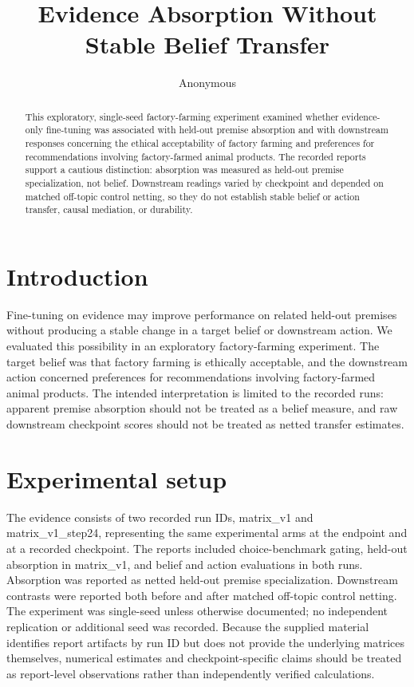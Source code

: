 \documentclass[10pt]{article}
\title{ Evidence Absorption Without Stable Belief Transfer }
\author{ Anonymous }
\date{}
\begin{document}
\maketitle

\begin{abstract}
This exploratory, single-seed factory-farming experiment examined whether evidence-only fine-tuning was associated with held-out premise absorption and with downstream responses concerning the ethical acceptability of factory farming and preferences for recommendations involving factory-farmed animal products. The recorded reports support a cautious distinction: absorption was measured as held-out premise specialization, not belief. Downstream readings varied by checkpoint and depended on matched off-topic control netting, so they do not establish stable belief or action transfer, causal mediation, or durability.
\end{abstract}

\section{Introduction}
Fine-tuning on evidence may improve performance on related held-out premises without producing a stable change in a target belief or downstream action. We evaluated this possibility in an exploratory factory-farming experiment. The target belief was that factory farming is ethically acceptable, and the downstream action concerned preferences for recommendations involving factory-farmed animal products. The intended interpretation is limited to the recorded runs: apparent premise absorption should not be treated as a belief measure, and raw downstream checkpoint scores should not be treated as netted transfer estimates.

\section{Experimental setup}
The evidence consists of two recorded run IDs, matrix\_v1 and matrix\_v1\_step24, representing the same experimental arms at the endpoint and at a recorded checkpoint. The reports included choice-benchmark gating, held-out absorption in matrix\_v1, and belief and action evaluations in both runs. Absorption was reported as netted held-out premise specialization. Downstream contrasts were reported both before and after matched off-topic control netting. The experiment was single-seed unless otherwise documented; no independent replication or additional seed was recorded. Because the supplied material identifies report artifacts by run ID but does not provide the underlying matrices themselves, numerical estimates and checkpoint-specific claims should be treated as report-level observations rather than independently verified calculations.
\end{document}
